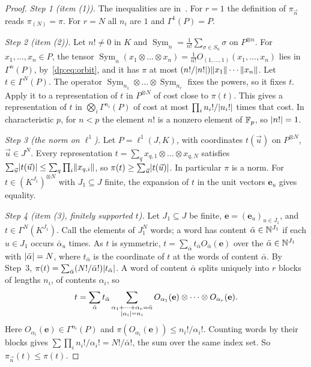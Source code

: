 \begin{proof}
\emph{Step 1 (item (1)).} The inequalities are in~\cite[Definition~14.21]{I}. For $r=1$ the definition of $\pi_{\vec n}$ reads $\pi_{(N)}=\pi$. For $r=N$ all $n_i$ are $1$ and $\Gamma^1(P)=P$.

\emph{Step 2 (item (2)).} Let $n!\ne0$ in $K$ and $\operatorname{Sym}_n=\frac1{n!}\sum_{\sigma\in S_n}\sigma$ on $P^{\otimes n}$. For $x_1,\dots,x_n\in P$, the tensor $\operatorname{Sym}_n(x_1\otimes\dots\otimes x_n)=\frac1{n!}O_{(1,\dots,1)}(x_1,\dots,x_n)$ lies in $\Gamma^n(P)$, by~\eqref{dp:eq:orbit}, and it has $\pi$ at most $(n!/\lvert n!\rvert)\lVert x_1\rVert\cdots\lVert x_n\rVert$. Let $t\in\Gamma^N(P)$. The operator $\operatorname{Sym}_{n_1}\otimes\dots\otimes\operatorname{Sym}_{n_r}$ fixes the powers, so it fixes $t$. Apply it to a representation of $t$ in $P^{\otimes N}$ of cost close to $\pi(t)$. This gives a representation of $t$ in $\bigotimes_i\Gamma^{n_i}(P)$ of cost at most $\prod_in_i!/\lvert n_i!\rvert$ times that cost. In characteristic $p$, for $n<p$ the element $n!$ is a nonzero element of $\mathbb F_p$, so $\lvert n!\rvert=1$.

\emph{Step 3 (the norm on $\ell^1$).} Let $P=\ell^1(J,K)$, with coordinates $t(\vec u)$ on $P^{\otimes N}$, $\vec u\in J^N$. Every representation $t=\sum_qx_{q,1}\otimes\dots\otimes x_{q,N}$ satisfies $\sum_{\vec u}\lvert t(\vec u)\rvert\le\sum_q\prod_i\lVert x_{q,i}\rVert$, so $\pi(t)\ge\sum_{\vec u}\lvert t(\vec u)\rvert$. In particular $\pi$ is a norm. For $t\in(K^{J_1})^{\otimes N}$ with $J_1\subseteq J$ finite, the expansion of $t$ in the unit vectors $\mathbf e_u$ gives equality.

\emph{Step 4 (item (3), finitely supported $t$).} Let $J_1\subseteq J$ be finite, $\mathbf e=(\mathbf e_u)_{u\in J_1}$, and $t\in\Gamma^N(K^{J_1})$. Call the elements of $J_1^N$ words; a word has content $\bar\alpha\in\mathbb N^{J_1}$ if each $u\in J_1$ occurs $\bar\alpha_u$ times. As $t$ is symmetric, $t=\sum_{\bar\alpha}t_{\bar\alpha}O_{\bar\alpha}(\mathbf e)$ over the $\bar\alpha\in\mathbb N^{J_1}$ with $\lvert \bar\alpha\rvert=N$, where $t_{\bar\alpha}$ is the coordinate of $t$ at the words of content $\bar\alpha$. By Step~3, $\pi(t)=\sum_{\bar\alpha}(N!/\bar\alpha!)\lvert t_{\bar\alpha}\rvert$. A word of content $\bar\alpha$ splits uniquely into $r$ blocks of lengths $n_i$, of contents $\alpha_i$, so
\[
 t=\sum_{\bar\alpha}t_{\bar\alpha}\sum_{\substack{\alpha_1+\dots+\alpha_r=\bar\alpha\\\lvert \alpha_i\rvert=n_i}}O_{\alpha_1}(\mathbf e)\otimes\dots\otimes O_{\alpha_r}(\mathbf e).
\]
Here $O_{\alpha_i}(\mathbf e)\in\Gamma^{n_i}(P)$ and $\pi(O_{\alpha_i}(\mathbf e))\le n_i!/\alpha_i!$. Counting words by their blocks gives $\sum\prod_in_i!/\alpha_i!=N!/\bar\alpha!$, the sum over the same index set. So $\pi_{\vec n}(t)\le\pi(t)$.


\end{proof}
